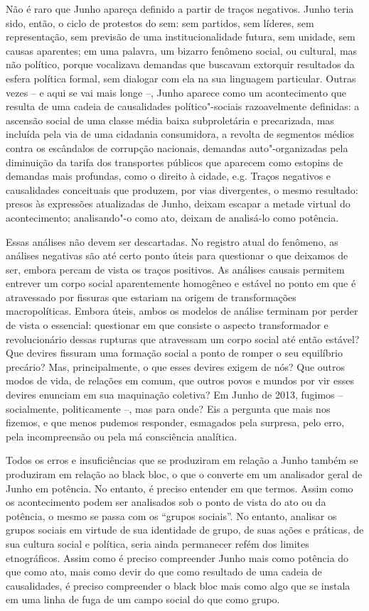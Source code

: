 Não é raro que Junho apareça definido a partir de traços negativos.
Junho teria sido, então, o ciclo de protestos do sem: sem partidos, sem
líderes, sem representação, sem previsão de uma institucionalidade
futura, sem unidade, sem causas aparentes; em uma palavra, um bizarro
fenômeno social, ou cultural, mas não político, porque vocalizava
demandas que buscavam extorquir resultados da esfera política formal,
sem dialogar com ela na sua linguagem particular. Outras vezes -- e aqui
se vai mais longe --, Junho aparece como um acontecimento que resulta de
uma cadeia de causalidades político"-sociais razoavelmente definidas: a
ascensão social de uma classe média baixa subproletária e precarizada,
mas incluída pela via de uma cidadania consumidora, a revolta de
segmentos médios contra os escândalos de corrupção nacionais, demandas
auto"-organizadas pela diminuição da tarifa dos transportes públicos que
aparecem como estopins de demandas mais profundas, como o direito à
cidade, e.g. Traços negativos e causalidades conceituais que produzem,
por vias divergentes, o mesmo resultado: presos às expressões
atualizadas de Junho, deixam escapar a metade virtual do acontecimento;
analisando"-o como ato, deixam de analisá-lo como potência.

Essas análises não devem ser descartadas. No registro atual do fenômeno,
as análises negativas são até certo ponto úteis para questionar o que
deixamos de ser, embora percam de vista os traços positivos. As análises
causais permitem entrever um corpo social aparentemente homogêneo e
estável no ponto em que é atravessado por fissuras que estariam na
origem de transformações macropolíticas. Embora úteis, ambos os modelos
de análise terminam por perder de vista o essencial: questionar em que
consiste o aspecto transformador e revolucionário dessas rupturas que
atravessam um corpo social até então estável? Que devires fissuram uma
formação social a ponto de romper o seu equilíbrio precário? Mas,
principalmente, o que esses devires exigem de nós? Que outros modos de
vida, de relações em comum, que outros povos e mundos por vir esses
devires enunciam em sua maquinação coletiva? Em Junho de 2013, fugimos
-- socialmente, politicamente --, mas para onde? Eis a pergunta que mais
nos fizemos, e que menos pudemos responder, esmagados pela surpresa,
pelo erro, pela incompreensão ou pela má consciência analítica.

Todos os erros e insuficiências que se produziram em relação a Junho
também se produziram em relação ao black bloc, o que o converte em um
analisador geral de Junho em potência. No entanto, é preciso entender em
que termos. Assim como os acontecimento podem ser analisados sob o ponto
de vista do ato ou da potência, o mesmo se passa com os ``grupos
sociais''. No entanto, analisar os grupos sociais em virtude de sua
identidade de grupo, de suas ações e práticas, de sua cultura social e
política, seria ainda permanecer refém dos limites etnográficos. Assim
como é preciso compreender Junho mais como potência do que como ato,
mais como devir do que como resultado de uma cadeia de causalidades, é
preciso compreender o black bloc mais como algo que se instala em uma
linha de fuga de um campo social do que como grupo.

